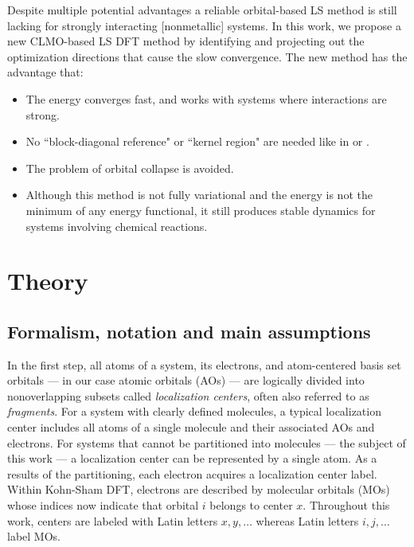 \documentclass[aps,prl,twocolumn,reprint,amsmath,amssymb]{revtex4-1}
\begin{document}
Despite multiple potential advantages a reliable orbital-based LS method is still lacking for strongly interacting [nonmetallic] systems. In this work, we propose a new CLMO-based LS DFT method by identifying and projecting out the optimization directions that cause the slow convergence. The new method has the advantage that: 
\begin{itemize}
\item The energy converges fast, and works with systems where interactions are strong.
\item No ``block-diagonal reference" or ``kernel region" are needed like in \cite{tsuchida2007augmented} or \cite{khaliullin2013efficient}.
\item The problem of orbital collapse is avoided. 
\item Although this method is not fully variational and the energy is not the minimum of any energy functional, it still produces stable dynamics for systems involving chemical reactions. 

\end{itemize}

\section{Theory} 

\subsection{Formalism, notation and main assumptions}
 
In the first step, all atoms of a system, its electrons, and atom-centered basis set orbitals --- in our case atomic orbitals (AOs) --- are logically divided into nonoverlapping subsets called \emph{localization centers}, often also referred to as \emph{fragments}. 
For a system with clearly defined molecules, a typical localization center includes all atoms of a single molecule and their associated AOs and electrons. 
For systems that cannot be partitioned into molecules --- the subject of this work --- a localization center can be represented by a single atom. 
As a results of the partitioning, each electron acquires a localization center label. 
Within Kohn-Sham DFT, electrons are described by molecular orbitals (MOs)  whose indices now indicate that orbital $i$ belongs to center $x$. Throughout this work, centers are labeled with Latin letters $x,y,\ldots$ whereas Latin letters $i,j,\ldots$ label MOs. 
\end{document}
